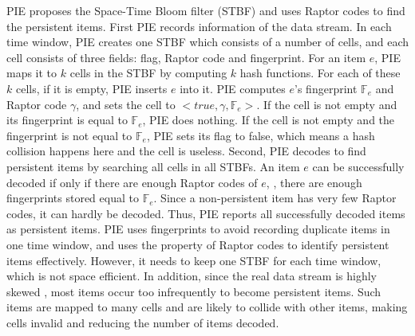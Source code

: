 PIE proposes the Space-Time Bloom filter (STBF) and uses Raptor codes\cite{raptorcode} to find the persistent items.
First PIE records information of the data stream.
In each time window, PIE creates one STBF which consists of a number of cells, and each cell consists of three fields: flag, Raptor code and fingerprint.
For an item $e$, PIE maps it to $k$ cells in the STBF by computing $k$ hash functions.
For each of these $k$ cells, if it is empty, PIE inserts $e$ into it.
PIE computes $e$'s fingerprint $\mathbb{F}_e$ and Raptor code $\gamma$, and sets the cell to $<true, \gamma, \mathbb{F}_e>$.
If the cell is not empty and its fingerprint is equal to $\mathbb{F}_e$, PIE does nothing.
If the cell is not empty and the fingerprint is not equal to $\mathbb{F}_e$, PIE sets its flag to false, which means a hash collision happens here and the cell is useless.
Second, PIE decodes to find persistent items by searching all cells in all STBFs.
An item $e$ can be successfully decoded if only if there are enough Raptor codes of $e$, \ie, there are enough fingerprints stored equal to $\mathbb{F}_e$.
Since a non-persistent item has very few Raptor codes, it can hardly be decoded.
Thus, PIE reports all successfully decoded items as persistent items.
PIE uses fingerprints to avoid recording duplicate items in one time window, and uses the property of Raptor codes to identify persistent items effectively.
However, it needs to keep one STBF for each time window, which is not space efficient.
In addition, since the real data stream is highly skewed \cite{asketch, sketchsurvey, zipf, powerlaw}, most items occur too infrequently to become persistent items.
Such items are mapped to many cells and are likely to collide with other items, making cells invalid and reducing the number of items decoded.



